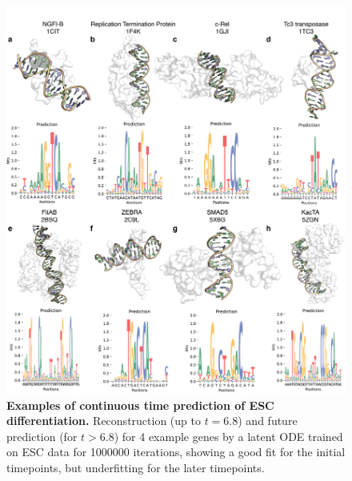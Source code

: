 \begin{center}
\begin{figure}[H]
  \includegraphics[width=\linewidth]{./pdnafigs/figS7.png}
    \caption[Examples of continuous time prediction of ESC differentiation.]{\textbf{Examples of continuous time prediction of ESC differentiation.} Reconstruction (up to $t=6.8$) and future prediction (for $t>6.8$) for 4 example genes by a  latent ODE \citep{chen2018neural} trained on ESC data \citep{Klein2015} for 1000000 iterations, showing a good fit for the initial timepoints, but underfitting for the later timepoints.}
  \label{fig:pdnaS7}
\end{figure}
\end{center}

